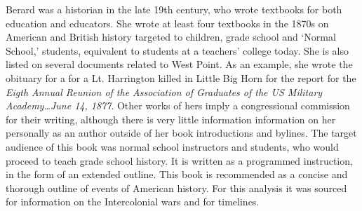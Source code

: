 Berard was a historian in the late 19th century, who wrote textbooks for both
education and educators. She wrote at least four textbooks in the 1870s on
American and British history targeted to children, grade school and `Normal
School,' students, equivalent to students at a teachers' college today. She is
also listed on several documents related to West Point. As an example, she wrote
the obituary for a for a Lt. Harrington killed in Little Big Horn for the report
for the \emph{Eigth Annual Reunion of the Association of Graduates of the US Military
Academy\ldots June 14, 1877}. Other works of hers imply a congressional
commission for their writing, although there is very little information
information on her personally as an author outside of her book introductions and
bylines. The target audience of this book was normal school instructors and
students, who would proceed to teach grade school history. It is written as a
programmed instruction, in the form of an extended outline. This book is
recommended as a concise and thorough outline of events of American history. For
this analysis it was sourced for information on the Intercolonial wars and for
timelines.

